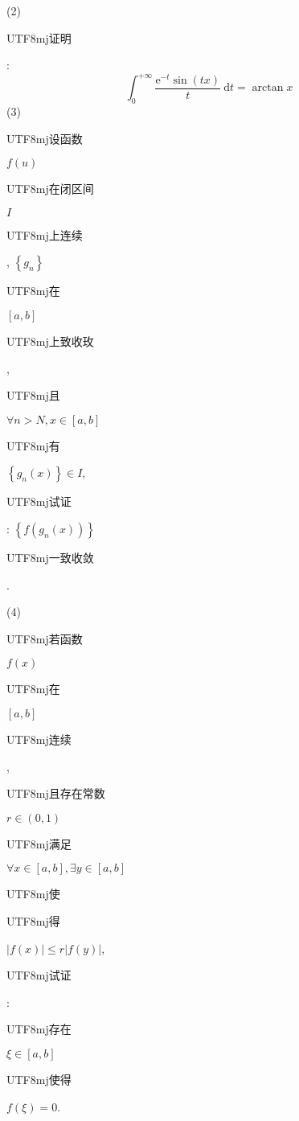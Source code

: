 \documentclass[10pt]{article}
\begin{document}
(2) \begin{CJK}{UTF8}{mj}证明\end{CJK}:
$$
\int_{0}^{+\infty} \frac{\mathrm{e}^{-t} \sin (t x)}{t} \mathrm{~d} t=\arctan x
$$
(3) \begin{CJK}{UTF8}{mj}设函数\end{CJK} $f(u)$ \begin{CJK}{UTF8}{mj}在闭区间\end{CJK} $I$ \begin{CJK}{UTF8}{mj}上连续\end{CJK}, $\left\{g_{n}\right\}$ \begin{CJK}{UTF8}{mj}在\end{CJK} $[a, b]$ \begin{CJK}{UTF8}{mj}上致收玫\end{CJK}, \begin{CJK}{UTF8}{mj}且\end{CJK} $\forall n>N, x \in[a, b]$ \begin{CJK}{UTF8}{mj}有\end{CJK} $\left\{g_{n}(x)\right\} \in I$, \begin{CJK}{UTF8}{mj}试证\end{CJK}: $\left\{f\left(g_{n}(x)\right)\right\}$ \begin{CJK}{UTF8}{mj}一致收敛\end{CJK}.

(4) \begin{CJK}{UTF8}{mj}若函数\end{CJK} $f(x)$ \begin{CJK}{UTF8}{mj}在\end{CJK} $[a, b]$ \begin{CJK}{UTF8}{mj}连续\end{CJK}, \begin{CJK}{UTF8}{mj}且存在常数\end{CJK} $r \in(0,1)$ \begin{CJK}{UTF8}{mj}满足\end{CJK} $\forall x \in[a, b], \exists y \in[a, b]$ \begin{CJK}{UTF8}{mj}使\end{CJK} \begin{CJK}{UTF8}{mj}得\end{CJK} $|f(x)| \leq r|f(y)|$, \begin{CJK}{UTF8}{mj}试证\end{CJK}: \begin{CJK}{UTF8}{mj}存在\end{CJK} $\xi \in[a, b]$ \begin{CJK}{UTF8}{mj}使得\end{CJK} $f(\xi)=0$.
\end{document}
